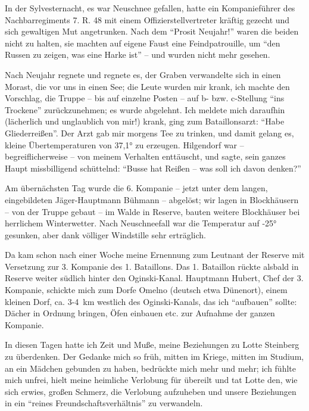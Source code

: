 In der Sylvesternacht, es war Neuschnee gefallen, hatte ein Kompanieführer des Nachbarregiments 7. R. 48 mit einem Offizierstellvertreter kräftig gezecht und sich gewaltigen Mut angetrunken. Nach dem \enquote{Prosit Neujahr!} waren die beiden nicht zu halten, sie machten auf eigene Faust eine Feindpatrouille, um \enquote{den Russen zu zeigen, was eine Harke ist} -- und wurden nicht mehr gesehen.

Nach Neujahr regnete und regnete es, der Graben verwandelte sich in einen Morast, die  vor uns in einen See; die Leute wurden mir krank, ich machte den Vorschlag, die Truppe -- bis auf einzelne Posten -- auf b- bzw. c-Stellung \enquote{ins Trockene} zurückzunehmen; es wurde abgelehnt. Ich meldete mich daraufhin (lächerlich und unglaublich von mir!) krank, ging zum Bataillonsarzt: \enquote{Habe Gliederreißen}. Der Arzt gab mir morgens Tee zu trinken, und damit gelang es, kleine Übertemperaturen von 37,1° zu erzeugen. Hilgendorf war -- begreiflicherweise -- von meinem Verhalten enttäuscht, und sagte, sein ganzes Haupt missbilligend schüttelnd: \enquote{Busse hat Reißen -- was soll ich davon denken?}

Am übernächsten Tag wurde die 6. Kompanie -- jetzt unter dem langen, eingebildeten Jäger-Hauptmann Bühmann -- abgelöst; wir lagen in Blockhäusern -- von der Truppe gebaut -- im Walde in Reserve, bauten weitere Blockhäuser bei herrlichem Winterwetter. Nach Neuschneefall war die Temperatur auf -25° gesunken, aber dank völliger Windstille sehr erträglich.

Da kam schon nach einer Woche meine Ernennung zum Leutnant der Reserve mit Versetzung zur 3. Kompanie des 1. Bataillons. Das 1. Bataillon rückte alsbald in Reserve weiter südlich hinter den Oginski-Kanal. Hauptmann Hubert, Chef der 3. Kompanie, schickte mich zum Dorfe Omelno (deutsch etwa Dünenort), einem kleinen Dorf, ca. 3-4~km westlich des Oginski-Kanals, das ich \enquote{aufbauen} sollte: Dächer in Ordnung bringen, Öfen einbauen etc. zur Aufnahme der ganzen Kompanie.

In diesen Tagen hatte ich Zeit und Muße, meine Beziehungen zu Lotte Steinberg zu überdenken. Der Gedanke mich so früh, mitten im Kriege, mitten im Studium, an ein Mädchen gebunden zu haben, bedrückte mich mehr und mehr; ich fühlte mich unfrei, hielt meine heimliche Verlobung für übereilt und tat Lotte den, wie sich erwies, großen Schmerz, die Verlobung aufzuheben und unsere Beziehungen in ein \enquote{reines Freundschaftsverhältnis} zu verwandeln.

